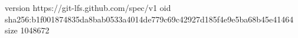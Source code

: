 version https://git-lfs.github.com/spec/v1
oid sha256:b1f001874835da8bab0533a4014de779c69c42927d185f4e9e5ba68b45e41464
size 1048672
